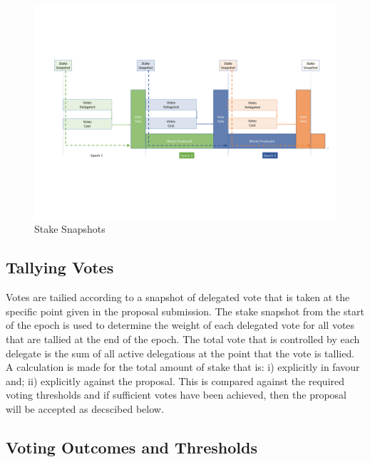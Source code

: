 \begin{figure}
  \includegraphics[trim=0 150 0 80,clip,width=\textwidth]{Stake-Snapshots}
  \caption{Stake Snapshots}
  \label{fig:stake-snapshots}
\end{figure}



\subsection{Tallying Votes}

Votes are tailied according to a snapshot of delegated vote that is taken at the specific point given in the proposal submission.  The stake snapshot from the start of the epoch is used to determine
the weight of each delegated vote for all votes that are tallied at the end of the epoch.  The total vote that is controlled by each delegate is the sum of all active delegations at the point that
the vote is tallied.  A calculation is made for the total amount of stake that is: i) explicitly in favour and; ii) explicitly against the proposal.  This is compared against the required voting thresholds and
if sufficient votes have been achieved, then the proposal will be accepted as decscibed below.

\subsection{Voting Outcomes and Thresholds}

